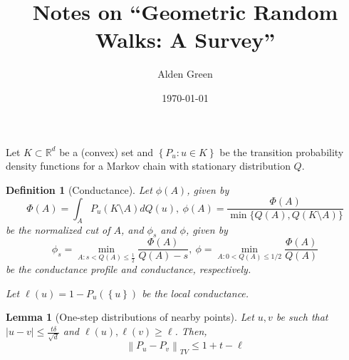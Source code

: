 \documentclass{article}
\newcommand{\Reals}{\mathbb{R}}
\newcommand{\norm}[1]{\left\lVert#1\right\rVert}
\newcommand{\abs}[1]{\left \lvert #1 \right \rvert}
\newcommand{\set}[1]{\left\{#1\right\}}
\newcommand{\Rd}{\Reals^d}
\newcommand{\1}{\mathbf{1}}
\theoremstyle{alden}
\newtheorem{definition}{Definition}[section]
\theoremstyle{aldenthm}
\newtheorem{lemma}{Lemma}
\theoremstyle{remark}
\begin{document}
	
\title{Notes on ``Geometric Random Walks: A Survey''}
\author{Alden Green}
\date{\today}
\maketitle

Let $K \subset \Rd$ be a (convex) set and $\set{P_u: u \in K}$ be the transition probability density functions for a Markov chain with stationary distribution $Q$.

\begin{definition}[Conductance]
	\label{def: conductance}
	Let $\phi(A)$, given by
	\begin{equation*}
	\Phi(A) = \int_A P_u(K \setminus A) dQ(u),~ \phi(A) = \frac{\Phi(A)}{\min\{Q(A), Q(K \setminus A)\}}
	\end{equation*}
	be the normalized cut of $A$, and $\phi_s$ and $\phi$, given by
	\begin{equation*}
	\phi_s = \min_{A: s < Q(A) \leq \frac{1}{2}} \frac{\Phi(A)}{Q(A) - s},~ \phi = \min_{A: 0 < Q(A) \leq 1/2} \frac{\Phi(A)}{Q(A)}
	\end{equation*}
	be the conductance profile and conductance, respectively.
	
	Let $\ell(u) = 1 - P_{u}(\set{u})$ be the local conductance.
\end{definition}

\begin{lemma}[One-step distributions of nearby points]
	\label{lem: one_step}
	Let $u,v$ be such that $\abs{u - v} \leq \frac{t \delta}{\sqrt{d}}$ and $\ell(u), \ell(v) \geq \ell$. Then,
	\begin{equation*}
	\norm{P_u - P_v}_{TV} \leq 1 + t - \ell
	\end{equation*}
\end{lemma}
\end{document}
